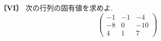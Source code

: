 \noindent\textbf{〔VI〕}
次の行列の固有値を求めよ.
\[
\begin{pmatrix}
-1 & -1 & -4\\
-8 & 0 & -10\\
4 & 1 & 7
\end{pmatrix}
\]
